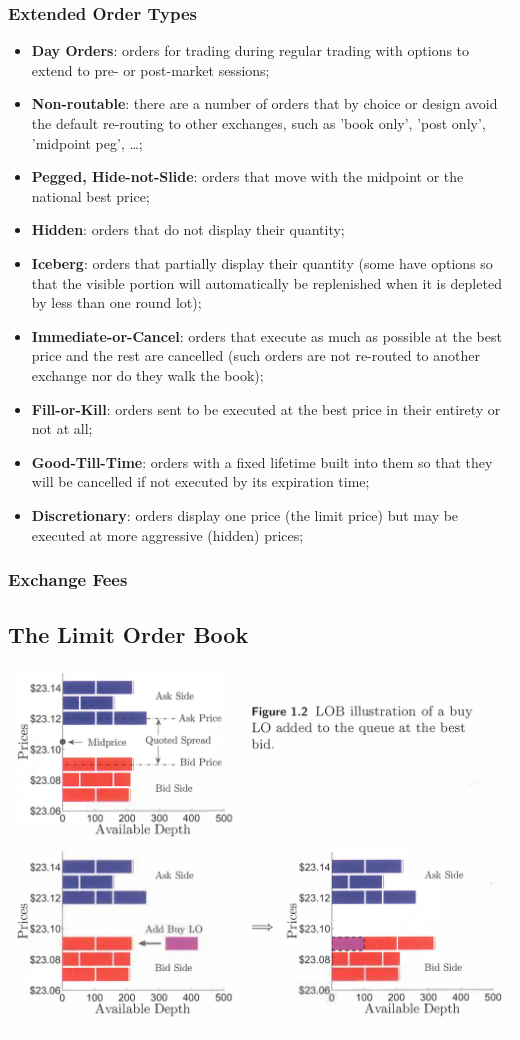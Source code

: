 \documentclass[11pt]{article}
\begin{document}
\subsubsection{Extended Order Types}
\label{sec:org1bc5ee4}
\begin{itemize}
\item \textbf{Day Orders}: orders for trading during regular trading with options to extend to pre- or post-market sessions;
\item \textbf{Non-routable}: there are a number of orders that by choice or design avoid the default re-routing to
other exchanges, such as 'book only', 'post only', 'midpoint peg', \ldots{};
\item \textbf{Pegged, Hide-not-Slide}: orders that move with the midpoint or the national best price;
\item \textbf{Hidden}: orders that do not display their quantity;
\item \textbf{Iceberg}: orders that partially display their quantity (some have options so that the visible portion
will automatically be replenished when it is depleted by less than one round lot);
\item \textbf{Immediate-or-Cancel}: orders that execute as much as possible at the best price and the rest are
cancelled (such orders are not re-routed to another exchange nor do they walk the book);
\item \textbf{Fill-or-Kill}: orders sent to be executed at the best price in their entirety or not at all;
\item \textbf{Good-Till-Time}: orders with a fixed lifetime built into them so that they will be cancelled if not
executed by its expiration time;
\item \textbf{Discretionary}: orders display one price (the limit price) but may be executed at more aggressive
(hidden) prices;
\end{itemize}
\subsubsection{Exchange Fees}
\label{sec:orgc979b39}
\subsection{The Limit Order Book}
\label{sec:org5e7abf7}
\begin{center}
\includegraphics[width=.8\textwidth]{../images/Misc/16.png}
\label{f1.2}
\end{center}
\end{document}
